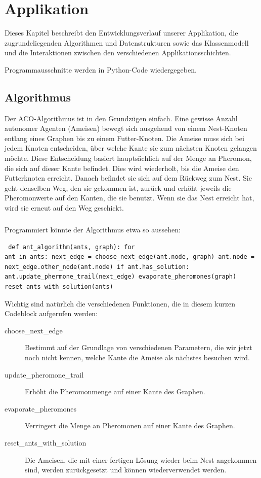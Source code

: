 

\chapter{Applikation}

Dieses Kapitel beschreibt den Entwicklungsverlauf unserer Applikation, die
zugrundeliegenden Algorithmen und Datenstrukturen sowie das Klassenmodell und
die Interaktionen zwischen den verschiedenen Applikationsschichten.

Programmausschnitte werden  in Python-Code wiedergegeben.

\section{Algorithmus}

Der ACO-Algorithmus ist in den Grundzügen einfach. Eine gewisse Anzahl autonomer
Agenten (Ameisen) bewegt sich ausgehend von einem Nest-Knoten entlang eines
Graphen bis zu einem Futter-Knoten. Die Ameise muss sich bei jedem Knoten
entscheiden, über welche Kante sie zum nächsten Knoten gelangen möchte. Diese
Entscheidung basiert hauptsächlich auf der Menge an Pheromon, die sich auf
dieser Kante befindet. Dies wird wiederholt, bis die Ameise den Futterknoten
erreicht. Danach befindet sie sich auf dem Rückweg zum Nest. Sie geht denselben
Weg, den sie gekommen ist, zurück und erhöht jeweils die Pheromonwerte auf den
Kanten, die sie benutzt. Wenn sie das Nest erreicht hat, wird sie erneut auf den
Weg geschickt.

\paragraph*{} \noindent Programmiert könnte der Algorithmus etwa so aussehen:

\lstset{language=Python} \begin{lstlisting} def ant_algorithm(ants, graph): for
ant in ants: next_edge = choose_next_edge(ant.node, graph) ant.node =
next_edge.other_node(ant.node) if ant.has_solution:
ant.update_phermone_trail(next_edge) evaporate_pheromones(graph)
reset_ants_with_solution(ants) \end{lstlisting}

\noindent Wichtig sind natürlich die verschiedenen Funktionen, die in diesem
kurzen Codeblock aufgerufen werden:

\begin{description} \item[choose\_next\_edge] Bestimmt auf der Grundlage von
verschiedenen Parametern, die wir jetzt noch nicht kennen, welche Kante die
Ameise als nächstes besuchen wird. \item[update\_pheromone\_trail] Erhöht die
Pheromonmenge auf einer Kante des Graphen. \item[evaporate\_pheromones]
Verringert die Menge an Pheromonen auf einer Kante des Graphen.
\item[reset\_ants\_with\_solution] Die Ameisen, die mit einer fertigen Lösung
wieder beim Nest angekommen sind, werden zurückgesetzt und können
wiederverwendet werden. \end{description}


